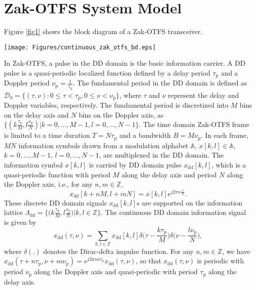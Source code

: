 \vspace{-1mm}
\section{Zak-OTFS System Model}
\label{sec2}
Figure \ref{fig1} shows the block diagram of a Zak-OTFS transceiver.
\begin{figure*}
\centering    \texttt{[image: Figures/continuous\_zak\_otfs\_bd.eps]}
\caption{Block diagram of Zak-OTFS transceiver.}
\label{fig1}      
\vspace{-4mm}
\end{figure*}
In Zak-OTFS, a pulse in the DD domain is the basic information carrier. A DD pulse is a quasi-periodic localized function defined by a delay period $\tau_{\mathrm{p}}$ and a Doppler period $\nu_{\mathrm{p}}=\frac{1}{\tau_{\mathrm{p}}}$. The fundamental period in the DD domain is defined as 
$\mathcal{D}_{0}= \{(\tau,\nu): 0\leq\tau<\tau_{\mathrm p}, 0\leq\nu<\nu_{\mathrm p}\}$,
where $\tau$ and $\nu$ represent the delay and Doppler variables, respectively. The fundamental period is discretized into $M$ bins on the delay axis and $N$ bins on the Doppler axis, as 
$\big\{(k\frac{\tau_{{\mathrm p}}}{M},l\frac{\nu_{{\mathrm p}}}{N}) | k=0,\ldots,M-1,l=0,\ldots,N-1\big\}$. The time domain Zak-OTFS frame is limited to a time duration $T=N\tau_{\mathrm p}$ and a bandwidth $B=M\nu_{\mathrm p}$. In each frame, $MN$ information symbols drawn from a modulation alphabet ${\mathbb A}$, $x[k,l]\in {\mathbb A}$, $k=0,\ldots,M-1$, $l=0,\ldots,N-1$, are multiplexed in the DD domain. The information symbol $x[k,l]$ is carried by DD domain pulse $x_{\mathrm{dd}}[k,l]$, which is a quasi-periodic function with period $M$ along the delay axis and period $N$ along the Doppler axis, i.e., for any $n,m\in\mathbb{Z}$,  
\begin{equation}
x_{\mathrm{dd}}[k+nM,l+mN]=x[k,l]e^{j2\pi n\frac{l}{N}}.
\end{equation}
These discrete DD domain signals $x_{\mathrm{dd}}[k,l]$s are supported on the information lattice 
$\Lambda_{\mathrm{dd}}=
\big\{\big(k\frac{\tau_{\mathrm p}}{M},l\frac{\nu_{\mathrm p}}{N}\big) | k,l\in \mathbb{Z}\big\}$.
The continuous DD domain information signal is given by
\vspace{-1mm}
\begin{equation}
x_{\mathrm{dd}}(\tau,\nu)=\sum_{k,l\in \mathbb{Z}} x_{\mathrm{dd}}[k,l] \delta\Big(\tau-\frac{k\tau_{\mathrm p}}{M}\Big)\delta\Big(\nu-\frac{l\nu_{\mathrm p}}{N}\Big),
\end{equation}
where $\delta(.)$ denotes the Dirac-delta impulse function. For any $n,m\in \mathbb{Z}$, we have
$x_{\mathrm{dd}}(\tau+n\tau_{\mathrm{p}},\nu+m\nu_{\mathrm{p}})=e^{j2\pi n\nu \tau_{\mathrm{p}}}x_{\mathrm{dd}}(\tau,\nu)$,
so that $x_{\mathrm{dd}}(\tau,\nu)$ is periodic with period $\nu_{\mathrm p}$ along the Doppler axis and quasi-periodic with period $\tau_{\mathrm p}$ along the delay axis.

